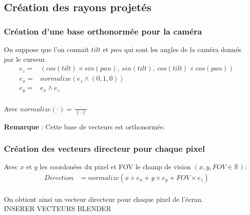 \newpage
\subsection{Création des rayons projetés}
\subsubsection{Création d'une base orthonormée pour la caméra}

On suppose que l'on connait $tilt$ et $pan$ qui sont les angles de la caméra donnés par le curseur. 
\begin{align*}
    e_z =&  (cos(tilt)\times sin(pan) ,\ sin(tilt) ,\ cos(tilt)\times cos(pan))\\
    e_x =&  normalize(e_z \wedge (0,1,0) )\\
    e_y =& e_x \wedge e_z\\
\end{align*}

Avec $normalize(\cdot ) = \frac{\cdot }{\| \cdot  \|}$

\textbf{Remarque} : Cette base de vecteurs est orthonormée.
\subsubsection{Création des vecteurs directeur pour chaque pixel}
Avec $x$ et $y$ les coordonées du pixel et FOV le champ de vision $(x,y,FOV\in \mathbb{R})$: 
\begin{align*}
    Direction &= normalize(x\times e_x + y\times e_y + FOV\times e_z)\\
\end{align*}

On obtient ainsi un vecteur directeur pour chaque pixel de l'écran.
\\INSERER VECTEURS BLENDER